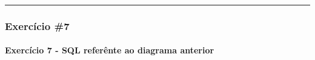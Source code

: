 \documentclass[
]{book}
\makeatletter
\newcommand*\pandocbounded[1]{%
  \sbox\pandoc@box{#1}%
  \Gscale@div\@tempa{\textheight}{\dimexpr\ht\pandoc@box+\dp\pandoc@box\relax}%
  \Gscale@div\@tempb{\linewidth}{\wd\pandoc@box}%
  \ifdim\@tempb\p@<\@tempa\p@\let\@tempa\@tempb\fi%
  \ifdim\@tempa\p@<\p@\scalebox{\@tempa}{\usebox\pandoc@box}%
  \else\usebox{\pandoc@box}%
  \fi%
}
\makeatother
\begin{document}
\begin{center}\rule{0.5\linewidth}{0.5pt}\end{center}

\subsubsection{Exercício \#7}\label{exercuxedcio-7-1}

\pandocbounded{}

\paragraph{Exercício 7 - SQL referênte ao diagrama anterior}\label{exercuxedcio-7---sql-referuxeante-ao-diagrama-anterior-1}
\end{document}
